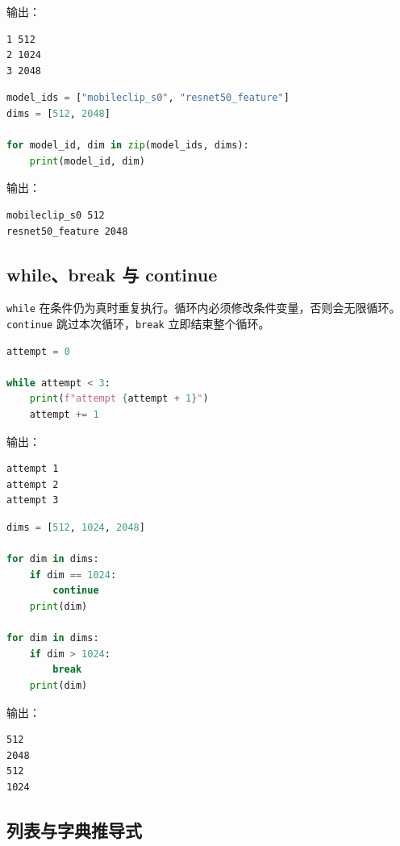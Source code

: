 输出：

\begin{lstlisting}
1 512
2 1024
3 2048
\end{lstlisting}

\begin{lstlisting}[language=Python]
model_ids = ["mobileclip_s0", "resnet50_feature"]
dims = [512, 2048]

for model_id, dim in zip(model_ids, dims):
    print(model_id, dim)
\end{lstlisting}

输出：

\begin{lstlisting}
mobileclip_s0 512
resnet50_feature 2048
\end{lstlisting}

\subsection{while、break 与 continue}\label{whilebreak-ux4e0e-continue}

\passthrough{\lstinline!while!}
在条件仍为真时重复执行。循环内必须修改条件变量，否则会无限循环。\passthrough{\lstinline!continue!}
跳过本次循环，\passthrough{\lstinline!break!} 立即结束整个循环。

\begin{lstlisting}[language=Python]
attempt = 0

while attempt < 3:
    print(f"attempt {attempt + 1}")
    attempt += 1
\end{lstlisting}

输出：

\begin{lstlisting}
attempt 1
attempt 2
attempt 3
\end{lstlisting}

\begin{lstlisting}[language=Python]
dims = [512, 1024, 2048]

for dim in dims:
    if dim == 1024:
        continue
    print(dim)

for dim in dims:
    if dim > 1024:
        break
    print(dim)
\end{lstlisting}

输出：

\begin{lstlisting}
512
2048
512
1024
\end{lstlisting}

\subsection{列表与字典推导式}\label{ux5217ux8868ux4e0eux5b57ux5178ux63a8ux5bfcux5f0f}


